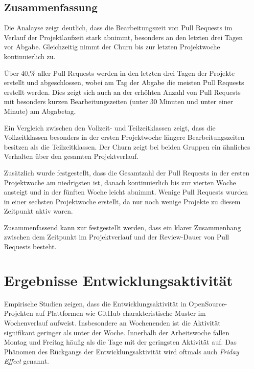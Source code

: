 \newpage

\subsection{Zusammenfassung}
Die Analayse zeigt deutlich, dass die Bearbeitungszeit von Pull Requests im Verlauf der Projektlaufzeit stark abnimmt, besonders an den letzten drei Tagen vor Abgabe. Gleichzeitig nimmt der Churn bis zur letzten Projektwoche kontinuierlich zu.

Über 40,\% aller Pull Requests werden in den letzten drei Tagen der Projekte erstellt und abgeschlossen, wobei am Tag der Abgabe die meisten Pull Requests erstellt werden. Dies zeigt sich auch an der erhöhten Anzahl von Pull Requests mit besonders kurzen Bearbeitungszeiten (unter 30 Minuten und unter einer Minute) am Abgabetag.

Ein Vergleich zwischen den Vollzeit- und Teilzeitklassen zeigt, dass die Vollzeitklassen besonders in der ersten Projektwoche längere Bearbeitungszeiten besitzen als die Teilzeitklassen. Der Churn zeigt bei beiden Gruppen ein ähnliches Verhalten über den gesamten Projektverlauf.

Zusätzlich wurde festgestellt, dass die Gesamtzahl der Pull Requests in der ersten Projektwoche am niedrigsten ist, danach kontinuierlich bis zur vierten Woche ansteigt und in der fünften Woche leicht abnimmt. Wenige Pull Requests wurden in einer sechsten Projektwoche erstellt, da nur noch wenige Projekte zu diesem Zeitpunkt aktiv waren.

Zusammenfassend kann zur  festgestellt werden, dass ein klarer Zusammenhang zwischen dem Zeitpunkt im Projektverlauf und der Review-Dauer von Pull Requests besteht.

\section{Ergebnisse Entwicklungsaktivität}
\label{sec:ErgebnisseEntwicklungsaktivtät}
Empirische Studien zeigen, dass die Entwicklungsaktivität in OpenSource-Projekten auf Plattformen wie GitHub charakteristische Muster im Wochenverlauf aufweist. Insbesondere an Wochenenden ist die Aktivität signifikant geringer als unter der Woche. Innerhalb der Arbeitswoche fallen Montag und Freitag häufig als die Tage mit der geringsten Aktivität auf. Das Phänomen des Rückgangs der Entwicklungsaktivität wird oftmals auch \textit{Friday Effect} genannt. \parencite{claes_programmers_2018}

